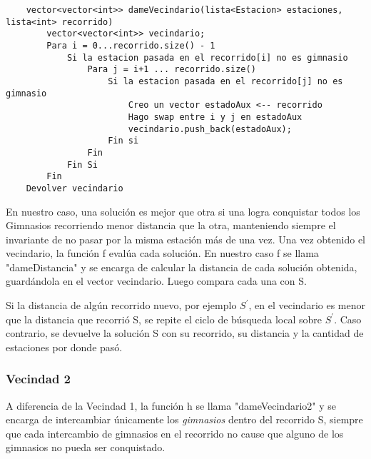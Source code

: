     \begin{codesnippet}
    \begin{verbatim}
    vector<vector<int>> dameVecindario(lista<Estacion> estaciones, lista<int> recorrido)
        vector<vector<int>> vecindario;
        Para i = 0...recorrido.size() - 1
            Si la estacion pasada en el recorrido[i] no es gimnasio
                Para j = i+1 ... recorrido.size()
                    Si la estacion pasada en el recorrido[j] no es gimnasio
                        Creo un vector estadoAux <-- recorrido
                        Hago swap entre i y j en estadoAux
                        vecindario.push_back(estadoAux);
                    Fin si
                Fin
            Fin Si
        Fin
    Devolver vecindario
    \end{verbatim}
    \end{codesnippet}

    En nuestro caso, una solución es mejor que otra si una logra conquistar todos los Gimnasios recorriendo menor distancia que la otra, manteniendo siempre el invariante de no pasar por la misma estación más de una vez. 
    Una vez obtenido el vecindario, la función f evalúa cada solución. En nuestro caso f se llama "dameDistancia" y se encarga de calcular la distancia de cada solución obtenida, guardándola en el vector vecindario. Luego compara cada una con S. 
    \par Si la distancia de algún recorrido nuevo, por ejemplo $S^{'}$, en el vecindario es menor que la distancia que recorrió S, se repite el ciclo de búsqueda local sobre $S^{'}$. Caso contrario, se devuelve la solución S con su recorrido, su distancia y la cantidad de estaciones por donde pasó.

   \subsubsection{Vecindad 2}

    \par A diferencia de la Vecindad 1, la función h se llama "dameVecindario2" y se encarga de intercambiar únicamente los \emph{gimnasios} dentro del recorrido S, siempre que cada intercambio de gimnasios en el recorrido no cause que alguno de los gimnasios no pueda ser conquistado.

